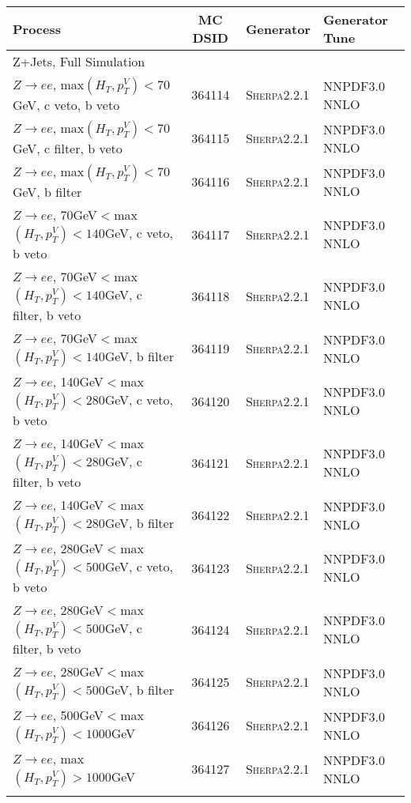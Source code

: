 \begin{table}[h!]
\scriptsize
\begin{center}
{\renewcommand{\arraystretch}{1.2}
\begin{tabular}{@{} lcll @{}}
\hhline{====}
Process	&	 MC DSID		&	Generator	& Generator Tune  \\ \hline
\multicolumn{4}{l}{Z+Jets, Full Simulation} \\ \hline
$Z\rightarrow ee$, max$(H_T,p_T^V)<70$GeV, c veto, b veto &  364114&  \textsc{Sherpa2.2.1} &NNPDF3.0 NNLO \\
$Z\rightarrow ee$, max$(H_T,p_T^V)<70$GeV, c filter, b veto & 364115&  \textsc{Sherpa2.2.1} &NNPDF3.0 NNLO \\
$Z\rightarrow ee$, max$(H_T,p_T^V)<70$GeV, b filter & 364116&  \textsc{Sherpa2.2.1} &NNPDF3.0 NNLO \\
$Z\rightarrow ee$, 70GeV$<$max$(H_T,p_T^V)<140$GeV, c veto, b veto & 364117& \textsc{Sherpa2.2.1} &NNPDF3.0 NNLO \\
$Z\rightarrow ee$, 70GeV$<$max$(H_T,p_T^V)<140$GeV, c filter, b veto & 364118& \textsc{Sherpa2.2.1} &NNPDF3.0 NNLO \\
$Z\rightarrow ee$, 70GeV$<$max$(H_T,p_T^V)<140$GeV, b filter & 364119& \textsc{Sherpa2.2.1} &NNPDF3.0 NNLO \\
$Z\rightarrow ee$, 140GeV$<$max$(H_T,p_T^V)<280$GeV, c veto, b veto & 364120&  \textsc{Sherpa2.2.1} &NNPDF3.0 NNLO \\
$Z\rightarrow ee$, 140GeV$<$max$(H_T,p_T^V)<280$GeV, c filter, b veto & 364121& \textsc{Sherpa2.2.1} &NNPDF3.0 NNLO \\
$Z\rightarrow ee$, 140GeV$<$max$(H_T,p_T^V)<280$GeV, b filter & 364122& \textsc{Sherpa2.2.1} &NNPDF3.0 NNLO \\
$Z\rightarrow ee$, 280GeV$<$max$(H_T,p_T^V)<500$GeV, c veto, b veto & 364123& \textsc{Sherpa2.2.1} &NNPDF3.0 NNLO \\
$Z\rightarrow ee$, 280GeV$<$max$(H_T,p_T^V)<500$GeV, c filter, b veto & 364124& \textsc{Sherpa2.2.1} &NNPDF3.0 NNLO \\
$Z\rightarrow ee$, 280GeV$<$max$(H_T,p_T^V)<500$GeV, b filter &  364125& \textsc{Sherpa2.2.1} &NNPDF3.0 NNLO \\
$Z\rightarrow ee$, 500GeV$<$max$(H_T,p_T^V)<1000$GeV & 364126& \textsc{Sherpa2.2.1} &NNPDF3.0 NNLO \\
$Z\rightarrow ee$, max$(H_T,p_T^V)>1000$GeV&  364127&  	 \textsc{Sherpa2.2.1} &NNPDF3.0 NNLO \\	\\

\end{tabular}}
\end{center}
\end{table}
